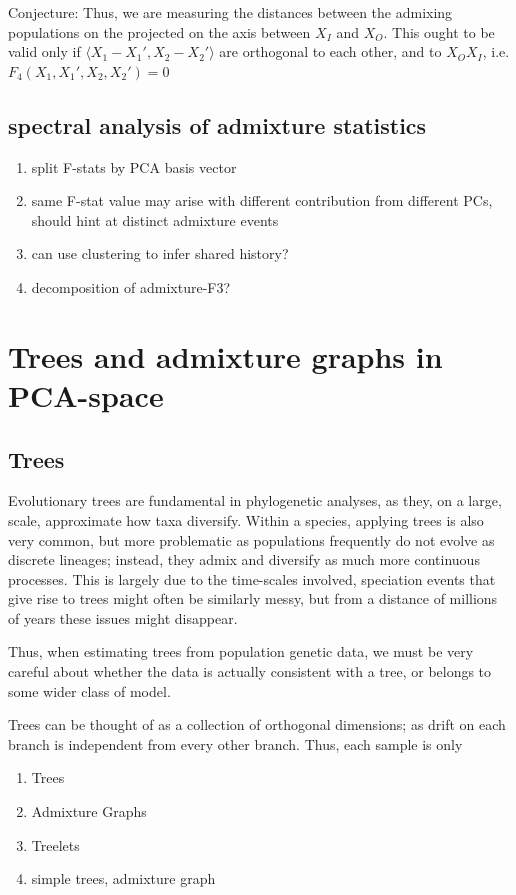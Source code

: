 \documentclass[10pt,a4paper]{article}
\begin{document}
Conjecture: Thus, we are measuring the distances between the admixing populations on the projected on the axis between $X_I$ and $X_O$. This ought to be valid only if $\langle X_1 - X_1', X_2 - X_2' \rangle$ are orthogonal to each other, and to $X_OX_I$, i.e.
$F_4(X_1, X_1', X_2, X_2') = 0$
 
	
\subsection{spectral analysis of admixture statistics}
\begin{enumerate}
	\item split F-stats by PCA basis vector
	\item same F-stat value may arise with different contribution from different PCs, should hint at distinct admixture events
	\item can use clustering to infer shared history?
	\item decomposition of admixture-F3?
\end{enumerate}

\section{Trees and admixture graphs in PCA-space}
\subsection{Trees}
Evolutionary trees are fundamental in phylogenetic analyses, as they, on a large, scale, approximate how taxa diversify. Within a species, applying trees is also very common, but more problematic as populations frequently do not evolve as discrete lineages; instead, they admix and diversify as much more continuous processes. This is largely due to the time-scales involved, speciation events that give rise to trees might often be similarly messy, but from a distance of millions of years these issues might disappear. 

Thus, when estimating trees from population genetic data, we must be very careful about whether the data is actually consistent with a tree, or belongs to some wider class of model.


Trees can be thought of as a collection of orthogonal dimensions; as drift on each branch is independent from every other branch. Thus, each sample is only 
\begin{enumerate}
	\item Trees
	\item Admixture Graphs
	\item Treelets
	\item simple trees, admixture graph
\end{enumerate}
\end{document}
